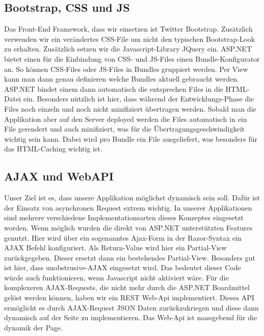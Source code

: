 	\subsection{Bootstrap, CSS und JS}
	Das Front-End Framework, dass wir einsetzen ist Twitter Bootstrap. Zusätzlich verwenden wir ein verändertes CSS-File um nicht den typischen Bootstrap-Look zu erhalten.
	Zusätzlich setzen wir die Javascript-Library JQuery ein.
	ASP.NET bietet einen für die Einbindung von CSS- und JS-Files einen Bundle-Konfigurator an. So können CSS-Files oder JS-Files in Bundles gruppiert werden. Per View kann man dann genau definieren welche Bundles aktuell gebraucht werden. ASP.NET bindet einem dann automatisch die entsprechen Files in die HTML-Datei ein.
	Besonders nützlich ist hier, dass während der Entwicklungs-Phase die Files noch einzeln und noch nicht minifiziert übertragen werden. Sobald man die Applikation aber auf den Server deployed werden die Files automatisch in ein File gerendert und auch minifiziert, was für die Übertragungsgeschwindigkeit wichtig sein kann.
	Dabei wird pro Bundle ein File ausgeliefert, was besonders für das HTML-Caching wichtig ist.

	\subsection{AJAX und WebAPI}
	Unser Ziel ist es, dass unsere Applikation möglichst dynamisch sein soll. Dafür ist der Einsatz von asynchronen Request extrem wichtig. In unserer Applikationen sind mehrere verschiedene Implementationsarten dieses Konzeptes eingesetzt worden. Wenn möglich wurden die direkt von ASP.NET unterstützten Features genutzt. Hier wird über ein sogenanntes Ajax-Form in der Razor-Syntax ein AJAX Befehl konfiguriert. Als Return-Value wird hier ein Partial-View zurückgegeben. Dieser ersetzt dann ein bestehendes Partial-View.
	Besonders gut ist hier, dass unobstrusive-AJAX eingesetzt wird. Das bedeutet dieser Code würde auch funktionieren, wenn Javascript nicht aktiviert wäre.
	Für die komplexeren AJAX-Requests, die nicht mehr durch die ASP.NET Boardmittel gelöst werden können, haben wir ein REST Web-Api implementiert. Dieses API ermöglicht es durch AJAX-Request JSON Daten zurückzukriegen und diese dann dynamisch auf der Seite zu implementieren.
	Das Web-Api ist massgebend für die dynamik der Page.
